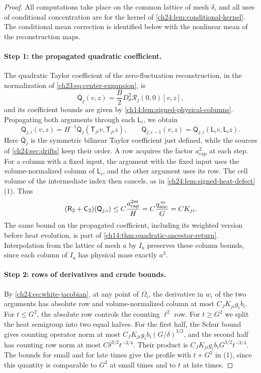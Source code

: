 \begin{proof}
All computations take place on the common lattice of mesh $\delta$, and all uses of conditional concentration are for the kernel of \cref{ch24:lem:conditional-kernel}. The conditional mean correction is identified below with the nonlinear mean of the reconstruction maps.

\paragraph{Step 1: the propagated quadratic coefficient.}
The quadratic Taylor coefficient of the zero-fluctuation reconstruction, in the normalization of \eqref{ch23:eq:center-expansion}, is
\[
 \overline{\mathsf Q}_j(v,z)=\frac B2D_\theta^2\mathscr R_j(0,0)[v,z],
\]
and its coefficient bounds are given by \cref{ch14:lem:signed-physical-columns}. Propagating both arguments through each $\mathsf L_i$, we obtain
\[
 \mathsf Q_{j,i}(v,z)=H^{-1}\overline{\mathsf Q}_j(\mathsf T_{ji}v,\mathsf T_{ji}z),\qquad
 \mathsf Q_{j,i-1}(v,z)=\mathsf Q_{j,i}(\mathsf L_iv,\mathsf L_iz).
\]
Here $\overline{\mathsf Q}_j$ is the symmetric bilinear Taylor coefficient just defined, while the sources of \cref{ch24:sec:drifts} keep their order. A row acquires the factor $a_{\mathrm{cap}}^2$ at each step. For a column with a fixed input, the argument with the fixed input uses the volume-normalized column of $\mathsf L_i$, and the other argument uses its row. The cell volume of the intermediate index then cancels, as in \cref{ch24:lem:signed-heat-defect}(1). Thus
\begin{equation}\label{ch24:eq:static-coefficient}
 (\mathsf R_2+\mathsf C_2)(\mathsf Q_{j,i})\le C\frac{a_{\mathrm{cap}}^{2m}}{H}=C\frac{q_{\mathrm{anc}}^{\,m}}{G}=CK_{ji}.
\end{equation}
The same bound on the propagated coefficient, including its weighted version before heat evolution, is part of \cref{ch14:thm:quadratic-ancestor-return}. Interpolation from the lattice of mesh $a$ by $I_a$ preserves these column bounds, since each column of $I_a$ has physical mass exactly $a^3$.

\paragraph{Step 2: rows of derivatives and crude bounds.}
By \eqref{ch24:eq:white-jacobian}, at any point of $\Omega_i$, the derivative in $w_i$ of the two arguments has absolute row and volume-normalized column at most $C_JK_{ji}g_ib_i$. For $t\le G^2$, the absolute row controls the counting $\ell^2$ row. For $t\ge G^2$ we split the heat semigroup into two equal halves. For the first half, the Schur bound gives counting operator norm at most $C_JK_{ji}g_ib_i(G/\delta)^{3/2}$, and the second half has counting row norm at most $C\delta^{3/2}t^{-3/4}$. Their product is $C_JK_{ji}g_ib_iG^{3/2}t^{-3/4}$. The bounds for small and for late times give the profile with $t+G^2$ in (1), since this quantity is comparable to $G^2$ at small times and to $t$ at late times.


\end{proof}
